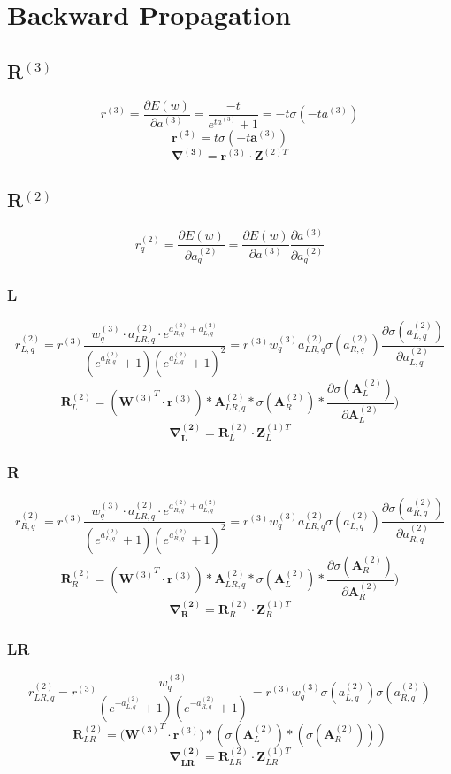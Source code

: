 \documentclass[11pt]{article}
\begin{document}
\section*{Backward Propagation}
\subsection*{R$^{(3)}$}
$$r^{(3)}=\frac{\partial E(w)}{\partial a^{(3)}} = \frac{-t}{e^{ta^{(3)}}+1} = -t\sigma{(-ta^{(3)})}$$
$$\mathbf{r}^{(3)}= t\sigma{(-t\mathbf{a}^{(3)})}$$
$$\mathbf{\nabla^{(3)}}= \mathbf{r}^{(3)} \cdot \mathbf{Z}^{(2)T}$$

\subsection*{R$^{(2)}$}
$$ r^{(2)}_{q} = \frac{\partial E(w)}{\partial a^{(2)}_q} = \frac{\partial E(w)}{\partial a^{(3)}}\frac{\partial a^{(3)}}{\partial a^{(2)}_q}  $$
\subsubsection*{L}
$$r^{(2)}_{L, q} = r^{(3)} \frac{w^{(3)}_{q} \cdot a_{LR,q}^{(2)} \cdot e^{a_{R,q}^{(2)}+a_{L,q}^{(2)}}}{(e^{a_{R,q}^{(2)}}+1)(e^{a_{L,q}^{(2)}}+1)^2}
=r^{(3)} w^{(3)}_{q} a_{LR,q}^{(2)} \sigma (a_{R,q}^{(2)}) \frac{\partial \sigma (a_{L,q}^{(2)})}{\partial a_{L,q}^{(2)}}$$
$$\mathbf{R}_L^{(2)}=({\mathbf{W}^{(3)}}^T \cdot \mathbf{r}^{(3)}) *\mathbf{A}_{LR,q}^{(2)} *  \sigma (\mathbf{A}_{R}^{(2)}) * \frac{\partial \sigma (\mathbf{A}_{L}^{(2)})}{\partial \mathbf{A}_{L}^{(2)}})$$
$$\mathbf{\nabla^{(2)}_L}= \mathbf{R}^{(2)}_L \cdot \mathbf{Z}^{(1)T}_L$$
\subsubsection*{R}
$$r^{(2)}_{R, q} = r^{(3)} \frac{w^{(3)}_{q} \cdot a_{LR,q}^{(2)} \cdot e^{a_{R,q}^{(2)}+a_{L,q}^{(2)}}}{(e^{a_{L,q}^{(2)}}+1)(e^{a_{R,q}^{(2)}}+1)^2}
=r^{(3)} w^{(3)}_{q} a_{LR,q}^{(2)} \sigma (a_{L,q}^{(2)}) \frac{\partial \sigma (a_{R,q}^{(2)})}{\partial a_{R,q}^{(2)}}$$
$$\mathbf{R}_R^{(2)}=({\mathbf{W}^{(3)}}^T \cdot \mathbf{r}^{(3)}) *\mathbf{A}_{LR,q}^{(2)} *  \sigma (\mathbf{A}_{L}^{(2)}) * \frac{\partial \sigma (\mathbf{A}_{R}^{(2)})}{\partial \mathbf{A}_{R}^{(2)}})$$
$$\mathbf{\nabla^{(2)}_R}= \mathbf{R}^{(2)}_R \cdot \mathbf{Z}^{(1)T}_R$$
\subsubsection*{LR}
$$r^{(2)}_{LR,q} =r^{(3)} \frac{w^{(3)}_{q}}{(e^{-a_{L,q}^{(2)}}+1)(e^{-a_{R,q}^{(2)}}+1)}
=r^{(3)} w^{(3)}_{q} \sigma (a_{L,q}^{(2)}) \sigma (a_{R,q}^{(2)}) $$
$$\mathbf{R}^{(2)}_{LR} = {(\mathbf{W}^{(3)}}^T \cdot \mathbf{r}^{(3)}) * ( \sigma (\mathbf{A}_{L}^{(2)}) * (\sigma (\mathbf{A}_{R}^{(2)}))) $$
$$\mathbf{\nabla^{(2)}_{LR}}= \mathbf{R}^{(2)}_{LR} \cdot \mathbf{Z}^{(1)T}_{LR}$$
\end{document}
